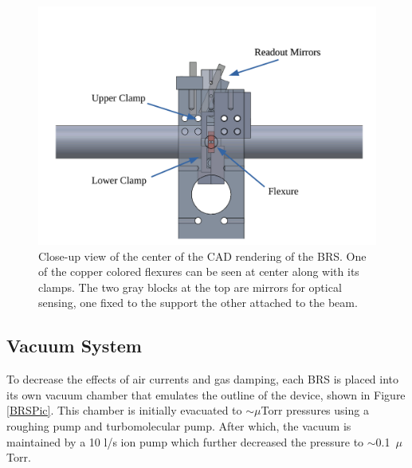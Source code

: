 \documentclass [12pt, proquest]{uwthesis}[2019]
\begin{document}
\begin{figure}[!h]
\begin{center} 
\includegraphics[width=\textwidth]{BRSFrontDetailLabeled.pdf}
\end{center}
\caption[Close up view of the center of the CAD rendering of the BRS]{Close-up view of the center of the CAD rendering of the BRS. One of the copper colored flexures can be seen at center along with its clamps. The two gray blocks at the top are mirrors for optical sensing, one fixed to the support the other attached to the beam.} \label{BRSFrontD}
\end{figure}

\subsection{Vacuum System}

To decrease the effects of air currents and gas damping, each BRS is placed into its own vacuum chamber that emulates the outline of the device, shown in Figure \ref{BRSPic}. This chamber is initially evacuated to $\sim \mu$Torr pressures using a roughing pump and turbomolecular pump. After which, the vacuum is maintained by a 10 l/s ion pump which further decreased the pressure to $\sim$0.1~$\mu$Torr.
\end{document}
